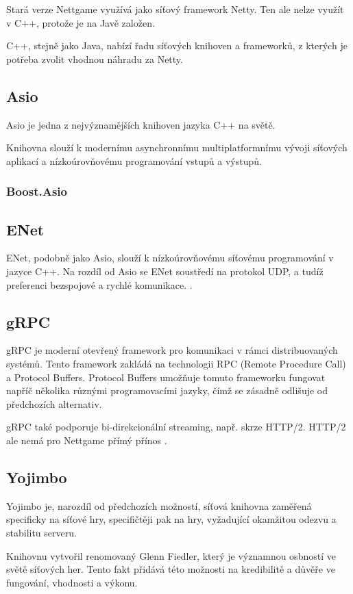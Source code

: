 \documentclass{article}
\begin{document}
Stará verze Nettgame využívá jako síťový framework Netty. Ten ale nelze využít v C++, protože je na Javě založen.

C++, stejně jako Java, nabízí řadu síťových knihoven a frameworků, z kterých je potřeba zvolit vhodnou náhradu za Netty.

\subsection{Asio}
Asio je jedna z nejvýznamějších knihoven jazyka C++ na světě. 

Knihovna slouží k modernímu asynchronnímu multiplatformnímu vývoji síťových aplikací a nízkoúrovňovému programování vstupů a výstupů. \cite{boostasio}
\subsubsection{Boost.Asio}

\subsection{ENet}
ENet, podobně jako Asio, slouží k nízkoúrovňovému síťovému programování v jazyce C++. Na rozdíl od Asio se ENet soustředí na protokol UDP, a tudíž preferenci bezspojové a rychlé komunikace. \cite{enet}.

\subsection{gRPC}
gRPC je moderní otevřený framework pro komunikaci v rámci distribuovaných systémů. Tento framework zakládá na technologii RPC (Remote Procedure Call) a Protocol Buffers. Protocol Buffers umožňuje tomuto frameworku fungovat napříč několika různými programovacími jazyky, čímž se zásadně odlišuje od předchozích alternativ.

gRPC také podporuje bi-direkcionální streaming, např. skrze HTTP/2. HTTP/2 ale nemá pro Nettgame přímý přínos \cite{grpc}.
\subsection{Yojimbo}
Yojimbo je, narozdíl od předchozích možností, síťová knihovna zaměřená specificky na síťové hry, specifičtěji pak na hry, vyžadující okamžitou odezvu a stabilitu serveru. 

Knihovnu vytvořil renomovaný Glenn Fiedler, který je významnou osbností ve světě síťových her. Tento fakt přidává této možnosti na kredibilitě a důvěře ve fungování, vhodnosti a výkonu.
\end{document}
